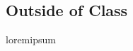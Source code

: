 \documentclass[12pt]{amsart} \usepackage{amssymb}
\begin{document}
%
%
%
%
%
%
%
%
%
%
%



\subsection*{Outside of Class}
loremipsum
\end{document}
